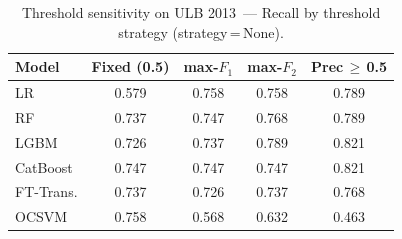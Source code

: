 \begin{table}[ht!]
\centering
\caption{Threshold sensitivity on ULB 2013~--- Recall by threshold strategy (strategy\,=\,None).}
\label{tab:threshold_ulb_recall}
\begin{tabular}{l c c c c}
\toprule
Model & Fixed (0.5) & max-$F_1$ & max-$F_2$ & Prec\,$\geq$\,0.5 \\
\midrule
LR         & 0.579 & 0.758 & 0.758 & 0.789 \\
RF         & 0.737 & 0.747 & 0.768 & 0.789 \\
LGBM       & 0.726 & 0.737 & 0.789 & 0.821 \\
CatBoost   & 0.747 & 0.747 & 0.747 & 0.821 \\
FT-Trans.  & 0.737 & 0.726 & 0.737 & 0.768 \\
OCSVM      & 0.758 & 0.568 & 0.632 & 0.463 \\
\bottomrule
\end{tabular}
\end{table}